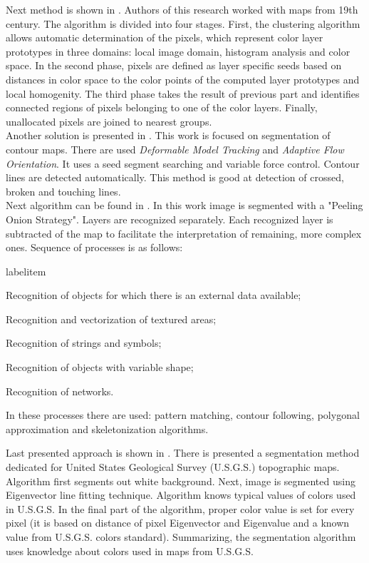 \documentclass[a4paper,onecolumn,oneside,12pt]{memoir}
\makeatletter
\renewenvironment{itemize}{
  \begin{list}{  
  \csname labelitem\romannumeral\the\@listdepth\endcsname}{
  \setlength{\leftmargin}{1em}
	\setlength{\topsep}{6pt}%
	\setlength{\partopsep}{0pt}%
	\setlength{\parskip}{0pt}%
	\setlength{\parsep}{0pt}%
	\setlength{\itemsep}{0pt}}
}{
  \end{list}
}
\makeatother
\begin{document}
Next method is shown in \cite{colorsOfThePast}. Authors of this research worked with maps from 
19th century. The algorithm is divided into four stages. First, the clustering algorithm allows 
automatic determination of the pixels, which represent color layer prototypes in three domains:
local image domain, histogram analysis and color space. In the second phase, pixels are defined as
layer specific seeds based on distances in color space to the color points of the computed layer 
prototypes and local homogenity. The third phase takes the result of previous part and identifies 
connected regions of pixels belonging to one of the color layers. Finally, unallocated pixels are
joined to nearest groups. \\

Another solution is presented in \cite{automaticVectorization}. This work is focused on segmentation
of contour maps. There are used \textit{Deformable Model Tracking} and \textit{Adaptive Flow 
Orientation}. It uses a seed segment searching and variable force control. Contour lines are 
detected automatically. This method is good at detection of crossed, broken and touching lines. \\

Next algorithm can be found in \cite{topographicMapsAutomaticVectorization}. In this work image is
segmented with a "Peeling Onion Strategy". Layers are recognized separately. Each recognized layer
is subtracted of the map to facilitate the interpretation of remaining, more complex ones. Sequence
of processes is as follows:

\begin{itemize}
  \item Recognition of objects for which there is an external data available;
  \item Recognition and vectorization of textured areas;
  \item Recognition of strings and symbols;
  \item Recognition of objects with variable shape;
  \item Recognition of networks.
\end{itemize}

In these processes there are used: pattern matching, contour following, polygonal approximation and
skeletonization algorithms.

Last presented approach is shown in \cite{colorMapSegmentation}. There is presented a segmentation
method dedicated for United States Geological Survey (U.S.G.S.) topographic maps. Algorithm first 
segments out white background. Next, image is segmented using Eigenvector line fitting technique.
Algorithm knows typical values of colors used in U.S.G.S. In the final part of the algorithm, proper
color value is set for every pixel (it is based on distance of pixel Eigenvector and Eigenvalue and
a known value from U.S.G.S. colors standard). Summarizing, the segmentation algorithm uses knowledge
about colors used in maps from U.S.G.S.
\end{document}

